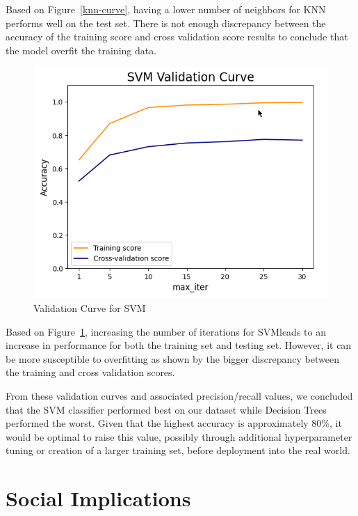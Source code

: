 \documentclass{article}
\begin{document}
Based on Figure~\ref{knn-curve}, having a lower number of neighbors for KNN performs well on the test set. There is not enough discrepancy between the accuracy of the training score and cross validation score results to conclude that the model overfit the training data.

\begin{figure}[ht]
\vskip 0.2in
\begin{center}
\centerline{\includegraphics[width=\columnwidth]{image7}}
\caption{Validation Curve for SVM}
\label{svm-curve}
\end{center}
\vskip -0.2in
\end{figure}

Based on Figure~\ref{svm-curve}, increasing the number of iterations for SVMleads to an increase in performance for both the training set and testing set. However, it can be more susceptible to overfitting as shown by the bigger discrepancy between the training and cross validation scores.

From these validation curves and associated precision/recall values, we concluded that the SVM classifier performed best on our dataset while Decision Trees performed the worst. Given that the highest accuracy is approximately 80\%, it would be optimal to raise this value, possibly through additional hyperparameter tuning or creation of a larger training set, before deployment into the real world. 

\section{Social Implications}
\label{social implications}
\end{document}
